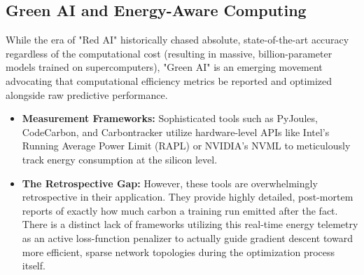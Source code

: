 \documentclass[12pt,a4paper]{article}
\begin{document}
\subsection{Green AI and Energy-Aware Computing}
While the era of "Red AI" historically chased absolute, state-of-the-art accuracy regardless of the computational cost (resulting in massive, billion-parameter models trained on supercomputers), "Green AI" is an emerging movement advocating that computational efficiency metrics be reported and optimized alongside raw predictive performance.
\begin{itemize}
    \item \textbf{Measurement Frameworks:} Sophisticated tools such as PyJoules, CodeCarbon, and Carbontracker utilize hardware-level APIs like Intel's Running Average Power Limit (RAPL) or NVIDIA's NVML to meticulously track energy consumption at the silicon level. 
    \item \textbf{The Retrospective Gap:} However, these tools are overwhelmingly retrospective in their application. They provide highly detailed, post-mortem reports of exactly how much carbon a training run emitted after the fact. There is a distinct lack of frameworks utilizing this real-time energy telemetry as an active loss-function penalizer to actually guide gradient descent toward more efficient, sparse network topologies during the optimization process itself.
\end{itemize}
\end{document}
